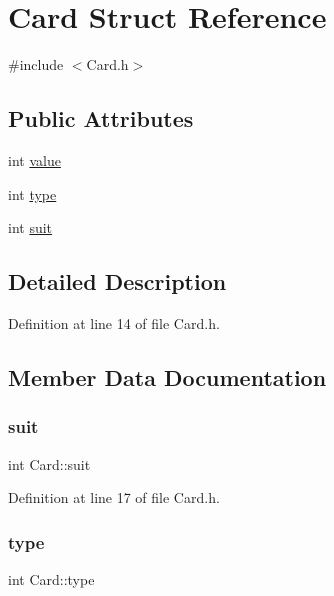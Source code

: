 \hypertarget{struct_card}{}\section{Card Struct Reference}
\label{struct_card}


{\ttfamily \#include $<$Card.\+h$>$}

\subsection*{Public Attributes}
\begin{DoxyCompactItemize}
\item 
int \mbox{\hyperlink{struct_card_a57c4269cef032dac1f282c9b2be3be4d}{value}}
\item 
int \mbox{\hyperlink{struct_card_ad7f5c3654b479f739fab1bcfed5e2765}{type}}
\item 
int \mbox{\hyperlink{struct_card_a68d1b935f3e4830af01fb9dba6c8220a}{suit}}
\end{DoxyCompactItemize}


\subsection{Detailed Description}


Definition at line 14 of file Card.\+h.



\subsection{Member Data Documentation}
\mbox{\label{struct_card_a68d1b935f3e4830af01fb9dba6c8220a}} 
\subsubsection{\texorpdfstring{suit}{suit}}
{\footnotesize\ttfamily int Card\+::suit}



Definition at line 17 of file Card.\+h.

\mbox{\label{struct_card_ad7f5c3654b479f739fab1bcfed5e2765}} 
\subsubsection{\texorpdfstring{type}{type}}
{\footnotesize\ttfamily int Card\+::type}



